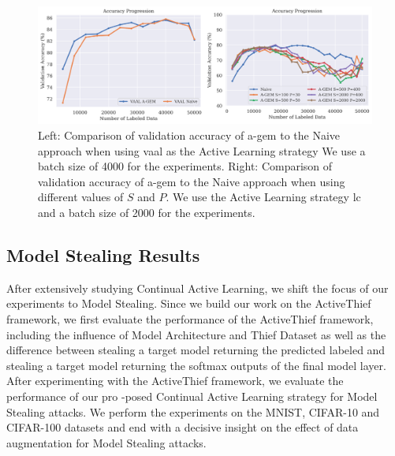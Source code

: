 \begin{figure}[h]
    \centering
    \includegraphics[width=\linewidth]{images/results_CAL/AGEM_plots.png}
    \caption[Continual Active Learning Custom Replay strategy]{Left: Comparison of validation accuracy of \gls{a-gem} to the Naive approach when using \gls{vaal} as the Active Learning strategy We use a batch size of 4000 for the experiments. Right: Comparison of validation accuracy of \gls{a-gem}
     to the Naive approach when using different values of $S$ and $P$. We use the Active Learning strategy \gls{lc} and a batch size of 2000 for the experiments.}
    \label{fig:Evaluation:Results:CAL:AGEM}
\end{figure}

\subsection{Model Stealing Results}
\label{sec:Evaluation:Results:MS}
After extensively studying Continual Active Learning, we shift the focus of our experiments to Model Stealing. Since we build our work on the ActiveThief framework, we first evaluate the performance of the ActiveThief framework, including the influence of Model Architecture and
Thief Dataset as well as the difference between stealing a target model returning the predicted labeled and stealing a target model returning the softmax outputs of the final model layer. After experimenting with the ActiveThief framework, we evaluate the performance of our pro
-posed Continual Active Learning strategy for Model Stealing attacks. We perform the experiments on the MNIST, CIFAR-10 and CIFAR-100 datasets and end with a decisive insight on the effect of data augmentation for Model Stealing attacks. \par


